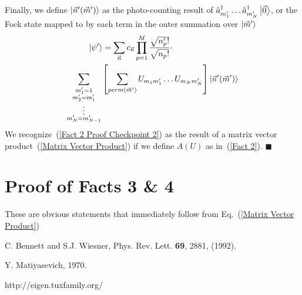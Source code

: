 \documentclass[aps,pra,twocolumn,showpacs,superscriptaddress,floatfix,10pt]{revtex4}
\begin{document}
Finally, we define $\ket{\vec{n}^\prime(\vec{m}^\prime)}$ as the photo-counting result of $\hat{a}_{m_1^\prime}^\dagger \dots \hat{a}_{m_N^\prime}^\dagger \ket{\vec{0}}$, or the Fock state mapped to by each term in the outer summation over $\ket{\vec{m}^\prime}$
\begin{eqnarray}
\label{Fact 2 Proof Checkpoint 2}
\ket{\psi^\prime} = \sum_{\vec{n}} c_{\vec{n}} \prod_{p=1}^{M} \frac{\sqrt{n_p^\prime !}}{ \sqrt{n_p !}} \cdot \quad \quad \quad \quad \quad \quad \quad \quad \\ \sum_{\substack{m_1^\prime = 1\\
		m_2^\prime = m_1^\prime\\
		\vdots \\
		m_N^\prime = m_{N-1}^\prime}}
\left[ \sum_{perm(\vec{m}^\prime)} U_{m_1 m_1^\prime} \dots U_{m_N m_N^\prime} \right] \ket{\vec{n}^\prime (\vec{m}^\prime) }
\end{eqnarray}
We recognize~(\ref{Fact 2 Proof Checkpoint 2}) as the result of a matrix vector product~(\ref{Matrix Vector Product}) if we define $A(U)$ as in~(\ref{Fact 2}).  $ \blacksquare $
\section{Proof of Facts 3 \& 4}
These are obvious statements that immediately follow from Eq.~(\ref{Matrix Vector Product})

\begin{thebibliography}{99}

 C. Bennett and S.J. Wiesner, Phys. Rev. Lett. \textbf{69}, 2881, (1992).

 Y. Matiyasevich, 1970.

 http://eigen.tuxfamily.org/

\end{thebibliography}
\end{document}
